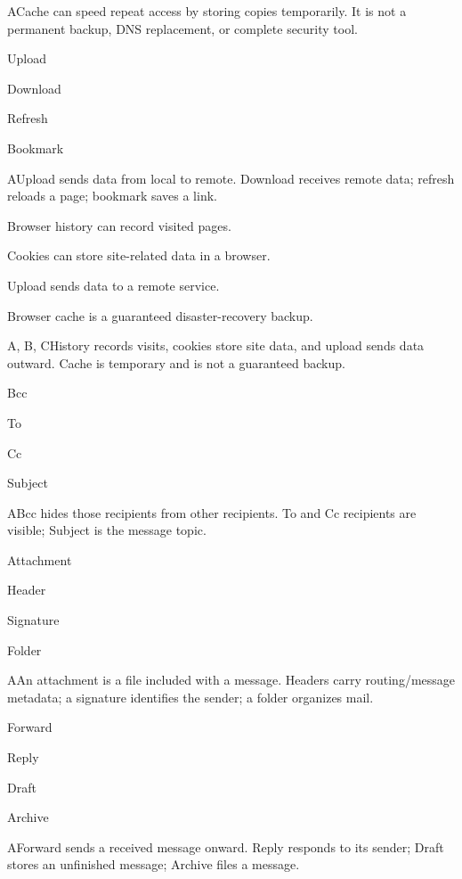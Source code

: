 \begin{enumerate}[label=\textbf{Q\arabic*.}, leftmargin=*]
  {A}{Cache can speed repeat access by storing copies temporarily. It is not a permanent backup, DNS replacement, or complete security tool.}
  {\item Upload
   \item Download
   \item Refresh
   \item Bookmark}
  {A}{Upload sends data from local to remote. Download receives remote data; refresh reloads a page; bookmark saves a link.}
  {\item Browser history can record visited pages.
   \item Cookies can store site-related data in a browser.
   \item Upload sends data to a remote service.
   \item Browser cache is a guaranteed disaster-recovery backup.}
  {A, B, C}{History records visits, cookies store site data, and upload sends data outward. Cache is temporary and is not a guaranteed backup.}
\fi
\ifnum{}
  {\item Bcc
   \item To
   \item Cc
   \item Subject}
  {A}{Bcc hides those recipients from other recipients. To and Cc recipients are visible; Subject is the message topic.}
  {\item Attachment
   \item Header
   \item Signature
   \item Folder}
  {A}{An attachment is a file included with a message. Headers carry routing/message metadata; a signature identifies the sender; a folder organizes mail.}
  {\item Forward
   \item Reply
   \item Draft
   \item Archive}
  {A}{Forward sends a received message onward. Reply responds to its sender; Draft stores an unfinished message; Archive files a message.}

\end{enumerate}
